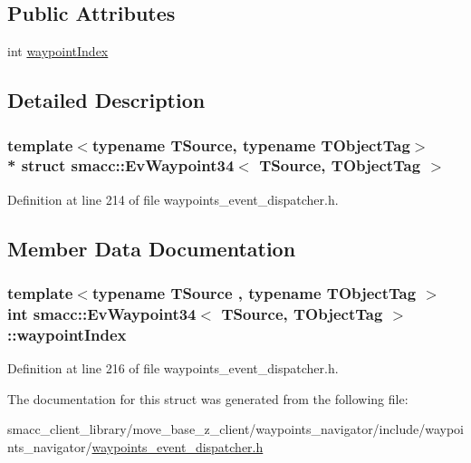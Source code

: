 \subsection*{Public Attributes}
\begin{DoxyCompactItemize}
\item 
int \hyperlink{structsmacc_1_1EvWaypoint34_a6b213f0118496334a45e61d2dc8f04fa}{waypoint\+Index}
\end{DoxyCompactItemize}


\subsection{Detailed Description}
\subsubsection*{template$<$typename T\+Source, typename T\+Object\+Tag$>$\\*
struct smacc\+::\+Ev\+Waypoint34$<$ T\+Source, T\+Object\+Tag $>$}



Definition at line 214 of file waypoints\+\_\+event\+\_\+dispatcher.\+h.



\subsection{Member Data Documentation}
\subsubsection[{\texorpdfstring{waypoint\+Index}{waypointIndex}}]{\setlength{\rightskip}{0pt plus 5cm}template$<$typename T\+Source , typename T\+Object\+Tag $>$ int {\bf smacc\+::\+Ev\+Waypoint34}$<$ T\+Source, T\+Object\+Tag $>$\+::waypoint\+Index}\hypertarget{structsmacc_1_1EvWaypoint34_a6b213f0118496334a45e61d2dc8f04fa}{}\label{structsmacc_1_1EvWaypoint34_a6b213f0118496334a45e61d2dc8f04fa}


Definition at line 216 of file waypoints\+\_\+event\+\_\+dispatcher.\+h.



The documentation for this struct was generated from the following file\+:\begin{DoxyCompactItemize}
\item 
smacc\+\_\+client\+\_\+library/move\+\_\+base\+\_\+z\+\_\+client/waypoints\+\_\+navigator/include/waypoints\+\_\+navigator/\hyperlink{waypoints__event__dispatcher_8h}{waypoints\+\_\+event\+\_\+dispatcher.\+h}\end{DoxyCompactItemize}
